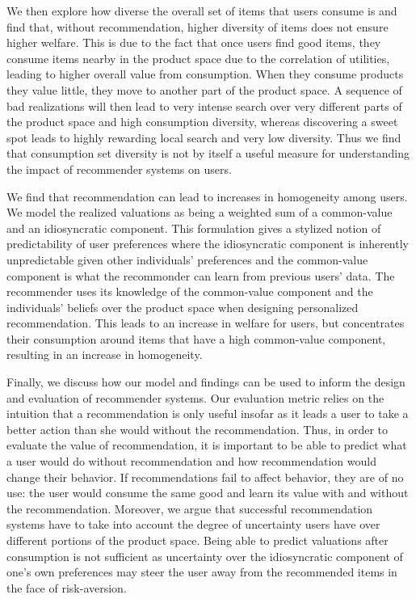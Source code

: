 \documentclass[sigconf]{acmart}
\begin{document}
We then explore how diverse the overall set of items that users consume is and find that, without recommendation, higher diversity of items does not ensure higher welfare.
This is due to the fact that once users find good items, they consume items nearby in the product space due to the correlation of utilities, leading to higher overall value from consumption. When they consume products they value little, they move to another part of the product space. A sequence of bad realizations will then lead to very intense search over very different parts of the product space and high consumption diversity, whereas discovering a sweet spot leads to highly rewarding local search and very low diversity. Thus we find that consumption set diversity is not by itself a useful measure for understanding the impact of recommender systems on users. 
\par

We find that recommendation can lead to increases in homogeneity among users. We model the realized valuations as being a weighted sum of a common-value and an idiosyncratic component. This formulation gives a stylized notion of predictability of user preferences where the idiosyncratic component is inherently unpredictable given other individuals' preferences and the common-value component is what the recommonder can learn from previous users' data. The recommender uses its knowledge of the common-value component and the individuals' beliefs over the product space when designing personalized recommendation. This leads to an increase in welfare for users, but concentrates their consumption around items that have a high common-value component, resulting in an increase in homogeneity.
\par

Finally, we discuss how our model and findings can be used to inform the design and evaluation of recommender systems. Our evaluation metric relies on the intuition that a recommendation is only useful insofar as it leads a user to take a better action than she would without the recommendation. Thus, in order to evaluate the value of recommendation, it is important to be able to predict what a user would do without recommendation and how recommendation would change their behavior. If recommendations fail to affect behavior, they are of no use: the user would consume the same good and learn its value with and without the recommendation. Moreover, we argue that successful recommendation systems have to take into account the degree of uncertainty users have over different portions of the product space. Being able to predict valuations after consumption is not sufficient as uncertainty over the idiosyncratic component of one's own preferences may steer the user away from the recommended items in the face of risk-aversion.
\par
\end{document}
